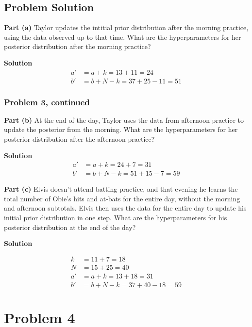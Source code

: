 \documentclass[12pt]{article}
\theoremstyle{definition}
\begin{document}
\subsection*{Problem Solution}

\noindent
{\bf Part (a)} Taylor updates the intitial prior distribution after the morning practice, using the data observed up to that time. What are the hyperparameters for her posterior distribution after the morning practice?


\bigskip
\noindent
{\bf Solution} 
\begin{align*}
a' &= a + k = 13 + 11 = 24\\
b' &= b + N - k = 37 + 25 - 11 = 51
\end{align*}

\newpage
\subsubsection*{Problem 3, continued}

\noindent
{\bf Part (b)} At the end of the day, Taylor uses the data from afternoon practice to update the posterior from the morning. What are the hyperparameters for her posterior distribution after the afternoon practice?

\noindent
{\bf Solution} 
\begin{align*}
a' &= a + k = 24 + 7 = 31\\
b' &= b + N - k = 51 + 15 - 7 = 59
\end{align*}


\noindent
{\bf Part (c)} Elvis doesn't attend batting practice, and that evening he learns the total number of Obie's hits and at-bats for the entire day, without the morning and afternoon subtotals. Elvis then uses the data for the entire day to update his initial prior distribution in one step. What are the hyperparameters for his posterior distribution at the end of the day?

\bigskip
\noindent
{\bf Solution} 

\begin{align*}
k &= 11 + 7 = 18\\
N &= 15 + 25 = 40\\
a' &= a + k = 13 + 18 = 31\\
b' &= b + N - k = 37 + 40 - 18 = 59
\end{align*}





\newpage
\section*{Problem 4}
\end{document}

